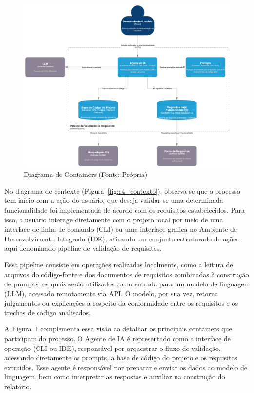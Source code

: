 \begin{figure}[H]
    \centering
    \begin{adjustbox}{width=1.0\textwidth,center}
        \includegraphics{imgs/c4_container.jpeg}
    \end{adjustbox}
    \caption{Diagrama de Containers (Fonte: Própria)}
    \label{fig:c4_containers}
\end{figure}

No diagrama de contexto (Figura~\ref{fig:c4_contexto}), observa-se que o processo tem início com a ação do usuário, que deseja validar se uma determinada funcionalidade foi implementada de acordo com os requisitos estabelecidos. Para isso, o usuário interage diretamente com o projeto local por meio de uma interface de linha de comando (CLI) ou uma interface gráfica no Ambiente de Desenvolvimento Integrado (IDE), ativando um conjunto estruturado de ações aqui denominado pipeline de validação de requisitos.

Essa pipeline consiste em operações realizadas localmente, como a leitura de arquivos do código-fonte e dos documentos de requisitos combinadas à construção de prompts, os quais serão utilizados como entrada para um modelo de linguagem (LLM), acessado remotamente via API. O modelo, por sua vez, retorna julgamentos ou explicações a respeito da conformidade entre os requisitos e os trechos de código analisados.

A Figura~\ref{fig:c4_containers} complementa essa visão ao detalhar os principais containers que participam do processo. O Agente de IA é representado como a interface de operação (CLI ou IDE), responsável por orquestrar o fluxo de validação, acessando diretamente os prompts, a base de código do projeto e os requisitos extraídos. Esse agente é responsável por preparar e enviar os dados ao modelo de linguagem, bem como interpretar as respostas e auxiliar na construção do relatório.

